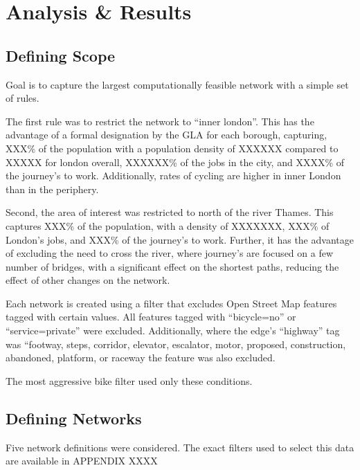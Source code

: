 \documentclass[11pt]{article} %
\begin{document}
\section{Analysis \& Results}

\subsection{Defining Scope}

Goal is to capture the largest computationally feasible network with a simple set of rules. 

The first rule was to restrict the network to ``inner london''. This has the advantage of a formal designation by the GLA for each borough, capturing, XXX\% of the population with a population density of XXXXXX compared to XXXXX for london overall, XXXXXX\% of the jobs in the city, and XXXX\% of the journey's to work. Additionally, rates of cycling are higher in inner London than in the periphery. 

Second, the area of interest was restricted to north of the river Thames. This captures XXX\% of the population, with a density of XXXXXXX, XXX\% of London's jobs, and XXX\% of the journey's to work. Further, it has the advantage of excluding the need to cross the river, where journey's are focused on a few number of bridges, with a significant effect on the shortest paths, reducing the effect of other changes on the network. 


Each network is created using a filter that excludes Open Street Map features tagged with certain values. All features tagged with ``bicycle=no'' or ``service=private'' were excluded. Additionally, where the edge's ``highway'' tag was ``footway, steps, corridor, elevator, escalator, motor, proposed, construction, abandoned, platform, or raceway the feature was also excluded. 

The most aggressive bike filter used only these conditions.





 

\subsection{Defining Networks}

Five network definitions were considered. The exact filters used to select this data are available in APPENDIX XXXX 
\end{document}
